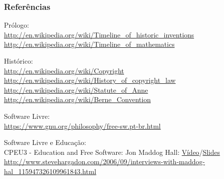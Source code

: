 \documentclass[serif,mathserif]{beamer}
\begin{document}
\begin{frame}
  \frametitle{Referências}
  \small
  Prólogo:\\
  \vspace{2mm}
  \url{http://en.wikipedia.org/wiki/Timeline_of_historic_inventions}
  \url{http://en.wikipedia.org/wiki/Timeline_of_mathematics}\\
  \vspace{2mm}

  Histórico:\\
  \vspace{2mm}
  \url{http://en.wikipedia.org/wiki/Copyright}
  \url{http://en.wikipedia.org/wiki/History_of_copyright_law}
  \url{http://en.wikipedia.org/wiki/Statute_of_Anne}
  \url{http://en.wikipedia.org/wiki/Berne_Convention}\\
  \vspace{2mm}

  Software Livre:\\
  \vspace{2mm}
  \url{https://www.gnu.org/philosophy/free-sw.pt-br.html}

\end{frame}
\begin{frame}

  Software Livre e Educação:\\
  \vspace{2mm}
  {\footnotesize CPEU3 - Education and Free Software: Jon Maddog Hall:} \href{https://www.youtube.com/watch?v=SOxB1IaozCA}{Vídeo}/\href{https://www.cs.helsinki.fi/linux15vuotta/hall.pdf}{Slides}\\
  \url{http://www.stevehargadon.com/2006/09/interviews-with-maddog-hal_115947326109961843.html}
\end{frame}
\end{document}
